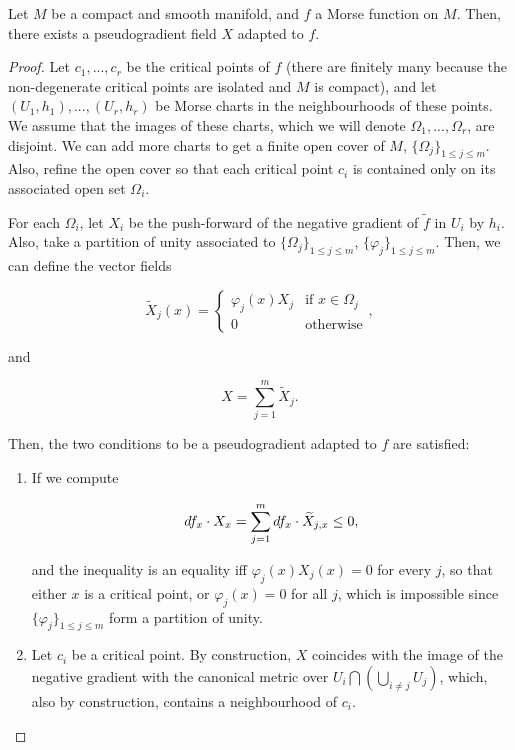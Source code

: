 \begin{prop}
Let $M$ be a compact and smooth manifold, and $f$ a Morse function on $M$. Then, there exists a pseudogradient field $X$ adapted to $f$.
\end{prop}

\begin{proof}
Let $c_1,...,c_r$ be the critical points of $f$ (there are finitely many because the non-degenerate critical points are isolated and $M$ is compact), and let $(U_1,h_1),...,(U_r,h_r)$ be Morse charts in the neighbourhoods of these points. We assume that the images of these charts, which we will denote $\Omega_1,...,\Omega_r$, are disjoint. We can add more charts to get a finite open cover of $M$, $\{\Omega_j\}_{1 \leq j \leq m}$. Also, refine the open cover so that each critical point $c_i$ is contained only on its associated open set $\Omega_i$.

For each $\Omega_i$, let $X_i$ be the push-forward of the negative gradient of $\tilde{f}$ in $U_i$ by $h_i$. Also, take a partition of unity associated to $\{\Omega_j\}_{1 \leq j \leq m}$, $\{\varphi_j\}_{1 \leq j \leq m}$. Then, we can define the vector fields

$$\widetilde{X}_j(x) = \left\{ \begin{array}{ll} \varphi_j(x) X_j & \text{if } x \in \Omega_j \\ 0 & \text{otherwise} \end{array} \right. ,$$

and

$$X = \sum_{j=1}^m \widetilde{X}_j .$$

Then, the two conditions to be a pseudogradient adapted to $f$ are satisfied:

\begin{enumerate}
\item If we compute

$$\\d f_x \cdot X_x = \sum_{j=1}^m \\d f_x \cdot \widetilde{X}_{j,x} \leq 0 ,$$

and the inequality is an equality iff $\varphi_j(x) X_j(x) = 0$ for every $j$, so that either $x$ is a critical point, or $\varphi_j(x)=0$ for all $j$, which is impossible since $\{\varphi_j\}_{1\leq j \leq m}$ form a partition of unity.
\item Let $c_i$ be a critical point. By construction, $X$ coincides with the image of the negative gradient with the canonical metric over $U_i \bigcap \left( \bigcup_{i \neq j} U_j\right)$, which, also by construction, contains a neighbourhood of $c_i$.
\end{enumerate}
\end{proof}

